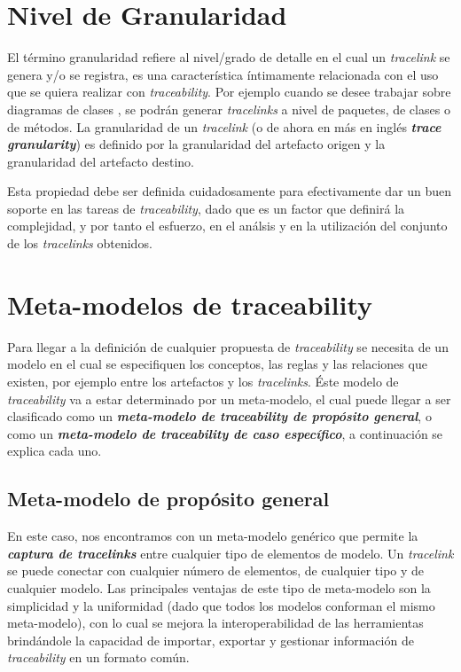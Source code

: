 \documentclass[a4paper,12pt,oneside,spanish]{book}
\begin{document}
\section{Nivel de Granularidad}
\label{sec:NivelGranularidad}

El término granularidad refiere al nivel/grado de detalle en el cual un \textit{tracelink} se genera y/o se registra, es una característica íntimamente relacionada con el uso que se quiera realizar con \textit{traceability}. Por ejemplo cuando se desee trabajar sobre diagramas de clases , se podrán generar \textit{tracelinks} a nivel de paquetes, de clases o de métodos. La granularidad de un \textit{tracelink} (o de ahora en más en inglés \textit{\textbf{trace granularity}}) es definido por la granularidad del artefacto origen y la granularidad del artefacto destino.

Esta propiedad debe ser definida cuidadosamente para efectivamente dar un buen soporte en las tareas de \textit{traceability}, dado que es un factor que definirá la complejidad, y por tanto el esfuerzo, en el análsis y en la utilización del conjunto de los \textit{tracelinks} obtenidos.




\section{Meta-modelos de traceability}

Para llegar a la definición de cualquier propuesta de \textit{traceability} se necesita de un modelo en el cual se especifiquen los conceptos, las reglas y las relaciones que existen, por ejemplo entre los artefactos y los \textit{tracelinks}. Éste modelo de \textit{traceability} va a estar determinado por un meta-modelo, el cual puede llegar a ser clasificado como un \textit{\textbf{meta-modelo de traceability de propósito general}}, o como un \textit{\textbf{meta-modelo de traceability de caso específico}}, a continuación se explica cada uno.

\subsection{Meta-modelo de propósito general}
\label{subsec:MetaModeloPropositoGeneral}

En este caso, nos encontramos con un meta-modelo genérico que permite la \textit{\textbf{captura de tracelinks}} entre cualquier tipo de elementos de modelo. Un \textit{tracelink} se puede conectar con cualquier número de elementos, de cualquier tipo y de cualquier modelo. Las principales ventajas de este tipo de meta-modelo son la simplicidad y la uniformidad (dado que todos los modelos conforman el mismo meta-modelo), con lo cual se mejora la interoperabilidad de las herramientas brindándole la capacidad de importar, exportar y gestionar información de \textit{traceability} en un formato común.
\end{document}
